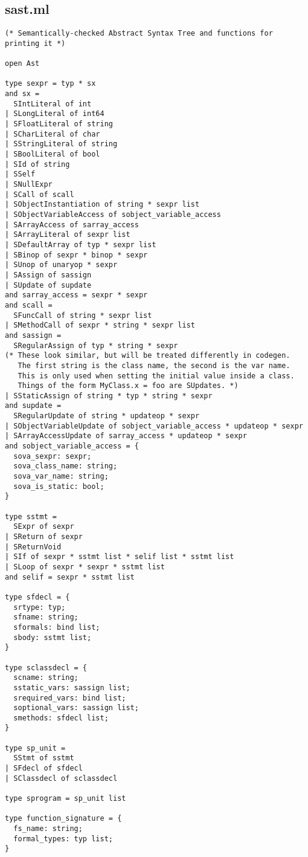 \documentclass{article}
\begin{document}
\subsection{sast.ml} 
\begin{verbatim}
(* Semantically-checked Abstract Syntax Tree and functions for printing it *)

open Ast

type sexpr = typ * sx
and sx =
  SIntLiteral of int
| SLongLiteral of int64
| SFloatLiteral of string
| SCharLiteral of char
| SStringLiteral of string
| SBoolLiteral of bool
| SId of string
| SSelf
| SNullExpr
| SCall of scall
| SObjectInstantiation of string * sexpr list
| SObjectVariableAccess of sobject_variable_access
| SArrayAccess of sarray_access
| SArrayLiteral of sexpr list
| SDefaultArray of typ * sexpr list
| SBinop of sexpr * binop * sexpr
| SUnop of unaryop * sexpr
| SAssign of sassign
| SUpdate of supdate
and sarray_access = sexpr * sexpr
and scall =
  SFuncCall of string * sexpr list
| SMethodCall of sexpr * string * sexpr list
and sassign =
  SRegularAssign of typ * string * sexpr
(* These look similar, but will be treated differently in codegen.
   The first string is the class name, the second is the var name.
   This is only used when setting the initial value inside a class.
   Things of the form MyClass.x = foo are SUpdates. *)
| SStaticAssign of string * typ * string * sexpr
and supdate =
  SRegularUpdate of string * updateop * sexpr
| SObjectVariableUpdate of sobject_variable_access * updateop * sexpr
| SArrayAccessUpdate of sarray_access * updateop * sexpr
and sobject_variable_access = {
  sova_sexpr: sexpr;
  sova_class_name: string;
  sova_var_name: string;
  sova_is_static: bool;
}

type sstmt =
  SExpr of sexpr
| SReturn of sexpr
| SReturnVoid
| SIf of sexpr * sstmt list * selif list * sstmt list
| SLoop of sexpr * sexpr * sstmt list
and selif = sexpr * sstmt list

type sfdecl = {
  srtype: typ;
  sfname: string;
  sformals: bind list;
  sbody: sstmt list;
}

type sclassdecl = {
  scname: string;
  sstatic_vars: sassign list;
  srequired_vars: bind list;
  soptional_vars: sassign list;
  smethods: sfdecl list;
}

type sp_unit =
  SStmt of sstmt
| SFdecl of sfdecl
| SClassdecl of sclassdecl

type sprogram = sp_unit list

type function_signature = {
  fs_name: string;
  formal_types: typ list;
}


\end{verbatim}
\end{document}
